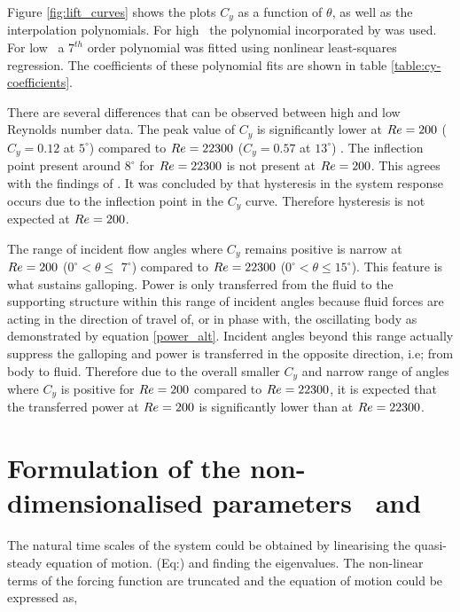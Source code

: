 Figure \ref{fig:lift_curves} shows the plots $C_y$ as a function of $\theta$, as well as the interpolation polynomials. For high \reynoldsnumber\ the polynomial incorporated by \cite{Parkinson1964} was used. For low \reynoldsnumber\ a $7^{th}$ order polynomial was fitted using nonlinear least-squares regression. The coefficients of these polynomial fits are shown in table \ref{table:cy-coefficients}.





There are several differences that can be observed between high and low Reynolds number data. The peak value of $C_y$ is  significantly lower at $Re=200$ ($C_y=0.12$ at $5^\circ$) compared to $Re=22300$ ($C_y=0.57$ at $13^\circ$) . The inflection point present around $8^\circ$ for $Re=22300$ is not present at $Re=200$. This agrees with the findings of \cite{Luo2003}.  It was concluded by \cite{Luo2003} that hysteresis in the system response occurs due to the inflection point in the $C_y$ curve. Therefore hysteresis is not expected at $Re=200$.

The range of incident flow angles where $C_y$ remains positive is narrow at $Re=200$ ($0^\circ <\theta \leq$ $7^\circ$) compared to $Re=22300$ ($0^\circ <\theta \leq 15^\circ$). This feature is what sustains galloping. Power is only transferred from the fluid to the supporting structure within this range of incident angles because fluid forces are acting in the direction of travel of, or in phase with, the oscillating body as demonstrated by equation \ref{power_alt}. Incident angles beyond this range actually suppress the galloping and power is transferred in the opposite direction, i.e; from body to fluid. Therefore due to the overall smaller $C_y$ and narrow range of angles where $C_y$ is positive for $Re=200$ compared to $Re=22300$, it is expected that the transferred power at $Re=200$ is significantly lower than at $Re=22300$.

\section{Formulation of the non-dimensionalised parameters \massstiff \ and \massdamp }
\label{sec: pi_1,pi_2_formulation}

The natural time scales of the system could be obtained by linearising the quasi-steady equation of motion. (Eq:) and finding the eigenvalues. The non-linear terms of the forcing function are truncated and the equation of motion could be expressed as, 


